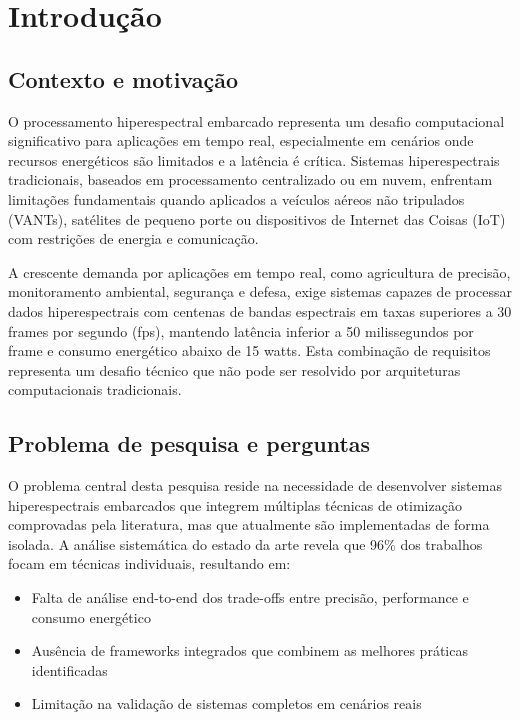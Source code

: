 \chapter{Introdução}\label{chp:Introducao}

\section{Contexto e motivação}\label{sec:contexto_motivacao}

O processamento hiperespectral embarcado representa um desafio computacional significativo para aplicações em tempo real, especialmente em cenários onde recursos energéticos são limitados e a latência é crítica. Sistemas hiperespectrais tradicionais, baseados em processamento centralizado ou em nuvem, enfrentam limitações fundamentais quando aplicados a veículos aéreos não tripulados (VANTs), satélites de pequeno porte ou dispositivos de Internet das Coisas (IoT) com restrições de energia e comunicação.

A crescente demanda por aplicações em tempo real, como agricultura de precisão, monitoramento ambiental, segurança e defesa, exige sistemas capazes de processar dados hiperespectrais com centenas de bandas espectrais em taxas superiores a 30 frames por segundo (fps), mantendo latência inferior a 50 milissegundos por frame e consumo energético abaixo de 15 watts. Esta combinação de requisitos representa um desafio técnico que não pode ser resolvido por arquiteturas computacionais tradicionais.

\section{Problema de pesquisa e perguntas}\label{sec:problema_perguntas}

O problema central desta pesquisa reside na necessidade de desenvolver sistemas hiperespectrais embarcados que integrem múltiplas técnicas de otimização comprovadas pela literatura, mas que atualmente são implementadas de forma isolada. A análise sistemática do estado da arte revela que 96\% dos trabalhos focam em técnicas individuais, resultando em:

\begin{itemize}
    \item Falta de análise end-to-end dos trade-offs entre precisão, performance e consumo energético
    \item Ausência de frameworks integrados que combinem as melhores práticas identificadas
    \item Limitação na validação de sistemas completos em cenários reais
\end{itemize}

